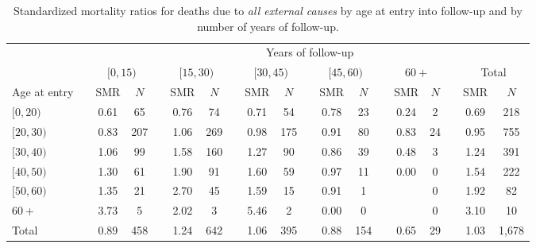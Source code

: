 \documentclass[]{article}
\begin{document}
\begin{table}[H]
\centering
\caption{Standardized mortality ratios for deaths due to \emph{all external causes} by age at entry into follow-up and by number of years of follow-up.} 
\begin{tabular}{llcclcclcclcclcclcc}
  \hline && \multicolumn{17}{c}{Years of follow-up} \\ 
&& \multicolumn{2}{c}{$[0, 15)$} && \multicolumn{2}{c}{$[15, 30)$} && \multicolumn{2}{c}{$[30, 45)$} && \multicolumn{2}{c}{$[45, 60)$} && \multicolumn{2}{c}{$60+$}&& \multicolumn{2}{c}{Total} \\ 
 \cline{3-4}\cline{6-7}\cline{9-10}\cline{12-13}\cline{15-16}\cline{18-19}Age at entry &   & SMR & $N$ &   & SMR & $N$ &   & SMR & $N$ &   & SMR & $N$ &   & SMR & $N$ &   & SMR & $N$ \\ 
  \midrule
$[0, 20)$ &  & 0.61 & 65 &  & 0.76 & 74 &  & 0.71 & 54 &  & 0.78 & 23 &  & 0.24 & 2 &  & 0.69 & 218 \\ 
  $[20, 30)$ &  & 0.83 & 207 &  & 1.06 & 269 &  & 0.98 & 175 &  & 0.91 & 80 &  & 0.83 & 24 &  & 0.95 & 755 \\ 
  $[30, 40)$ &  & 1.06 & 99 &  & 1.58 & 160 &  & 1.27 & 90 &  & 0.86 & 39 &  & 0.48 & 3 &  & 1.24 & 391 \\ 
  $[40, 50)$ &  & 1.30 & 61 &  & 1.90 & 91 &  & 1.60 & 59 &  & 0.97 & 11 &  & 0.00 & 0 &  & 1.54 & 222 \\ 
  $[50, 60)$ &  & 1.35 & 21 &  & 2.70 & 45 &  & 1.59 & 15 &  & 0.91 & 1 &  &  & 0 &  & 1.92 & 82 \\ 
  $60+$ &  & 3.73 & 5 &  & 2.02 & 3 &  & 5.46 & 2 &  & 0.00 & 0 &  &  & 0 &  & 3.10 & 10 \\ 
  Total &  & 0.89 & 458 &  & 1.24 & 642 &  & 1.06 & 395 &  & 0.88 & 154 &  & 0.65 & 29 &  & 1.03 & 1,678 \\ 
   \bottomrule
\end{tabular}
\end{table}

\vspace{1cm}
\end{document}
